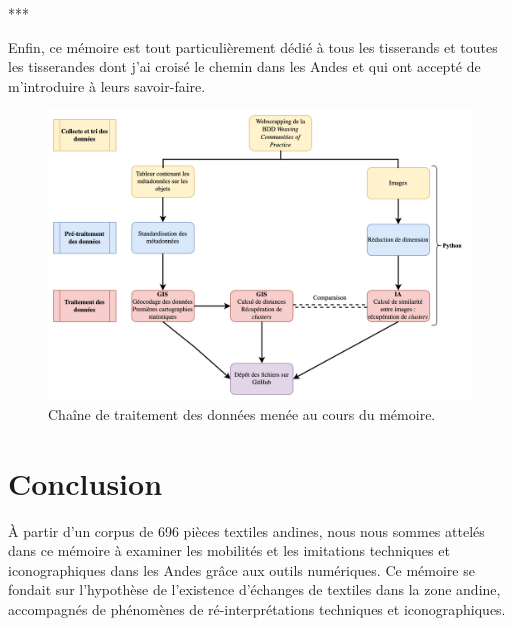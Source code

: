 \documentclass[a4paper, twoside]{book}
\begin{document}
\begin{center}
   ***
\end{center}

Enfin, ce mémoire est tout particulièrement dédié à tous les tisserands et toutes les tisserandes dont j'ai croisé le chemin dans les Andes et qui ont accepté de m'introduire à leurs savoir-faire.

\clearpage
\thispagestyle{empty}
\cleardoublepage

\renewcommand{\contentsname}{Sommaire}
\tableofcontents
\markboth{}{}{}

\clearpage

\mainmatter





\begin{figure}[!h]
	\begin{center}
		\includegraphics[width=17cm]{../images/pipelineM2.jpg}
           	 \caption{Chaîne de traitement des données menée au cours du mémoire.}
           	 \label{pipeline}
	 \end{center}
  \end{figure}






\chapter*{Conclusion}

À partir d'un corpus de 696 pièces textiles andines, nous nous sommes attelés dans ce mémoire à examiner les mobilités et les imitations techniques et iconographiques dans les Andes grâce aux outils numériques. Ce mémoire se fondait sur l'hypothèse de l'existence d'échanges de textiles dans la zone andine, accompagnés de phénomènes de ré-interprétations techniques et iconographiques. \\
\end{document}
